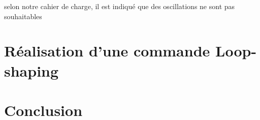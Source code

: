 \documentclass[12pt, a4paper, openany]{report}
\begin{document}
selon notre cahier de charge, il est indiqué que des oscillations ne sont pas souhaitables
 
   
 



   
\chapter{Réalisation d'une commande Loop-shaping}
 


\chapter*{Conclusion}




\end{document}

